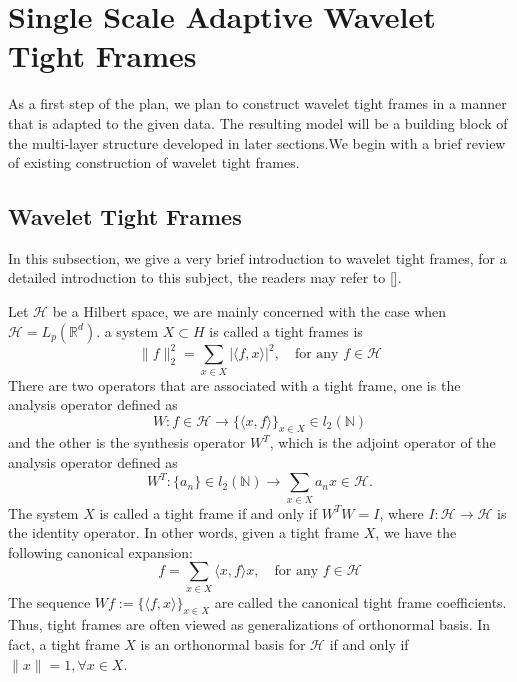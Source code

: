 \documentclass[a4paper]{article}
\begin{document}
\section{Single Scale Adaptive Wavelet Tight Frames}
As a first step of the plan, we plan to construct wavelet tight frames in a manner that is adapted to the given data. The resulting model will be a building block of the multi-layer structure developed in later sections.We begin with a brief review of existing construction of wavelet tight frames.

\subsection{Wavelet Tight Frames}
In this subsection, we give a very brief introduction to wavelet tight frames, for a detailed introduction to this subject, the readers may refer to [].

Let $\mathcal{H}$ be a Hilbert space, we are mainly concerned with the case when $\mathcal{H}=L_p(\mathbb{R}^d)$. a system $X\subset H$ is called a tight frames is
\[
	\|f\|_2^2 = \sum_{x\in X} |\langle f,x\rangle |^2, \quad \textrm{for any } f\in \mathcal{H}
\]
There are two operators that are associated with a tight frame, one is the analysis operator defined as
\[
	W: f\in \mathcal{H} \rightarrow \{\langle x,f\rangle\}_{x\in X} \in l_2(\mathbb{N})
\]
and the other is the synthesis operator $W^T$, which is the adjoint operator of the analysis operator defined as
\[
	W^T : \{a_n\} \in l_2(\mathbb{N}) \rightarrow \sum_{x\in X} a_n x\in \mathcal{H}.
\]
The system $X$ is called a tight frame if and only if $W^TW=I$, where $I: \mathcal{H} \rightarrow \mathcal{H}$ is the identity operator. In other words, given a tight frame $X$, we have the following canonical expansion:
\[
	f=\sum_{x\in X} \langle x,f\rangle x, \quad \textrm{for any } f\in \mathcal{H}
\]
The sequence $Wf:=\{\langle f,x\rangle \}_{x\in X}$ are called the canonical tight frame coefficients. Thus, tight frames are often viewed as generalizations of orthonormal basis. In fact, a tight frame $X$ is an orthonormal basis for $\mathcal{H}$ if and only if $\|x\|=1,\forall x\in X$.
\end{document}
